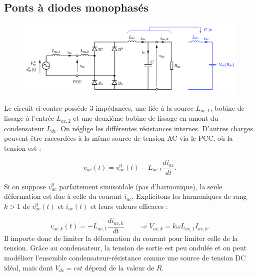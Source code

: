 	\subsection{Ponts à diodes monophasés}
		\begin{figure}
		\vspace{-5mm}
		\includegraphics[scale=0.3]{ch2/14}
		\end{figure} 
		Le circuit ci-contre possède 3 impédances, une liée à la source $L_{ac,1}$, bobine de lissage à l'entrée $L_{ac,2}$ et une deuxième bobine de lissage en amont du condensateur $L_{dc}$. On néglige les différentes résistances internes. D'autres charges peuvent être raccordées à la même source de tension AC via le PCC, où la tension est :
		
		\begin{equation}
			v_{ac}(t) = v_{ac}^0(t) - L_{ac,1}\frac{di_{ac}}{dt}.
		\end{equation}
		
		Si on suppose $v_{ac}^0$ parfaitement sinusoïdale (pas d'harmonique), la seule déformation est due à celle du courant $i_{ac}$. Explicitons les harmoniques de rang $k>1$ de $v_{ac}^0(t)$ et $i_{ac}(t)$ et leurs valeurs efficaces :
		
		\begin{equation}
			v_{ac,k}(t) = -L_{ac,1}\frac{di_{ac,k}}{dt} \qquad \Rightarrow  V_{ac,k} = k\omega L_{ac,1} I_{ac,k}.
		\end{equation}
		Il importe donc de limiter la déformation du courant pour limiter celle de la tension. Grâce au condensateur, la tension de sortie est peu ondulée et on peut modéliser l'ensemble condensateur-résistance comme une source de tension DC idéal, mais dont $V_{dc}=cst$ dépend de la valeur de $R$. 
		

